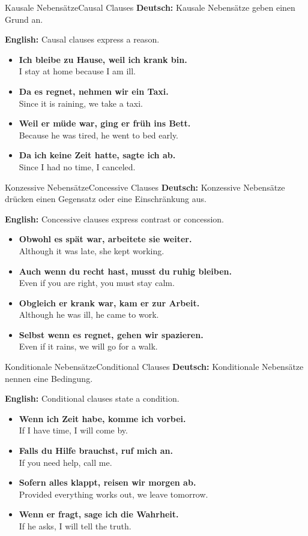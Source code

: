 \documentclass[a4paper,11pt]{article}
\newcommand{\GermanText}[1]{\textbf{Deutsch: }#1\par}
\newcommand{\EnglishText}[1]{{\color{SoftGray}\textbf{English: }#1\par}}
\newcommand{\ExampleItem}[2]{\item \textbf{#1}\\{\color{SoftGray}#2}}
\begin{document}
\begin{grammarentry}{Kausale Nebensätze}{Causal Clauses}
    \GermanText{Kausale Nebensätze geben einen Grund an.}
    \EnglishText{Causal clauses express a reason.}
    \begin{exbox}
        \begin{itemize}
            \ExampleItem{Ich bleibe zu Hause, weil ich krank bin.}{I stay at home because I am ill.}
            \ExampleItem{Da es regnet, nehmen wir ein Taxi.}{Since it is raining, we take a taxi.}
            \ExampleItem{Weil er müde war, ging er früh ins Bett.}{Because he was tired, he went to bed early.}
            \ExampleItem{Da ich keine Zeit hatte, sagte ich ab.}{Since I had no time, I canceled.}
        \end{itemize}
    \end{exbox}
\end{grammarentry}

\begin{grammarentry}{Konzessive Nebensätze}{Concessive Clauses}
    \GermanText{Konzessive Nebensätze drücken einen Gegensatz oder eine Einschränkung aus.}
    \EnglishText{Concessive clauses express contrast or concession.}
    \begin{exbox}
        \begin{itemize}
            \ExampleItem{Obwohl es spät war, arbeitete sie weiter.}{Although it was late, she kept working.}
            \ExampleItem{Auch wenn du recht hast, musst du ruhig bleiben.}{Even if you are right, you must stay calm.}
            \ExampleItem{Obgleich er krank war, kam er zur Arbeit.}{Although he was ill, he came to work.}
            \ExampleItem{Selbst wenn es regnet, gehen wir spazieren.}{Even if it rains, we will go for a walk.}
        \end{itemize}
    \end{exbox}
\end{grammarentry}

\begin{grammarentry}{Konditionale Nebensätze}{Conditional Clauses}
    \GermanText{Konditionale Nebensätze nennen eine Bedingung.}
    \EnglishText{Conditional clauses state a condition.}
    \begin{exbox}
        \begin{itemize}
            \ExampleItem{Wenn ich Zeit habe, komme ich vorbei.}{If I have time, I will come by.}
            \ExampleItem{Falls du Hilfe brauchst, ruf mich an.}{If you need help, call me.}
            \ExampleItem{Sofern alles klappt, reisen wir morgen ab.}{Provided everything works out, we leave tomorrow.}
            \ExampleItem{Wenn er fragt, sage ich die Wahrheit.}{If he asks, I will tell the truth.}
        \end{itemize}
    \end{exbox}
\end{grammarentry}
\end{document}
